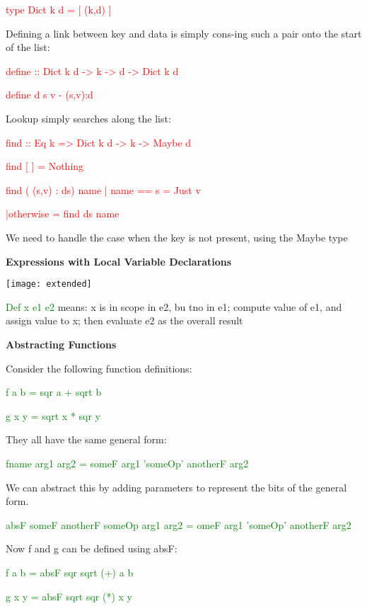 \documentclass{article}
\begin{document}
\textcolor{red}{type Dict k d = [ (k,d) ]}

Defining a link between key and data is simply cons-ing such a pair onto the start of the list:

\textcolor{red}{define :: Dict k d -> k -> d -> Dict k d}

\textcolor{red}{define d s v - (s,v):d}

Lookup simply searches along the list:

\textcolor{red}{find :: Eq k => Dict k d -> k -> Maybe d}

\textcolor{red}{find [ ] \textunderscore = Nothing}

\textcolor{red}{find ( (s,v) : ds) name | name == s = Just v}

\textcolor{red}{  				|otherwise = find ds name}

We need to handle the case when the key is not present, using the Maybe type





\textbf{Expressions with Local Variable Declarations}



\texttt{[image: extended]}

\textcolor{green}{Def  x  e1  e2} means: x is in scope in e2, bu tno in e1; compute value of e1, and assign value to x; then evaluate e2 as the overall result


\textbf{Abstracting Functions}

Consider the following function definitions:

\textcolor{green}{f  a  b = sqr a + sqrt b}

\textcolor{green}{g  x  y = sqrt x * sqr y}

They all have the same general form:

\textcolor{green}{fname arg1 arg2 = someF arg1 'someOp' anotherF arg2}

We can abstract this by adding parameters to represent the bits of the general form.

\textcolor{green}{absF someF anotherF someOp arg1 arg2 = omeF arg1 'someOp' anotherF arg2}

Now f and g can be defined using absF:

\textcolor{green}{f  a  b = absF sqr sqrt (+) a b}

\textcolor{green}{g  x  y = absF sqrt sqr (*) x y}
\end{document}

